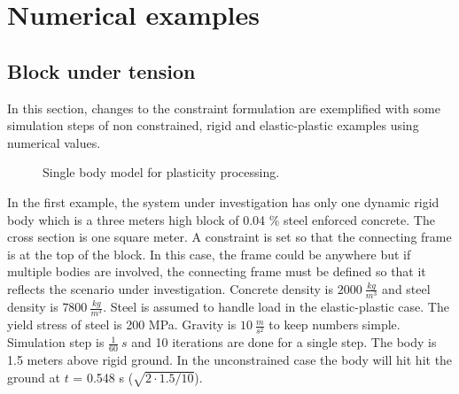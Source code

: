 \section{Numerical examples}

\subsection{Block under tension}
In this section, changes to the constraint formulation are exemplified with some simulation steps
of non constrained, rigid and
elastic-plastic examples using numerical values.

\begin{figure}[htb!]
\centering
{}
\caption{Single body model for plasticity processing.}
\label{fig:tensionModel}
\end{figure}

In the first example, the system under investigation
has only one dynamic rigid body which is a three meters high block of 0.04 \% steel enforced concrete. 
The cross section is one square meter.
A constraint is set so that the connecting frame is at the top of the block. 
In this case, the frame could be anywhere but if multiple bodies are involved, the connecting frame must be defined
so that it reflects the scenario under investigation.
Concrete density is $2000\ \frac{kg}{m^3}$ and steel density is $7800\ \frac{kg}{m^3}$. 
Steel is assumed to handle load in the elastic-plastic case. The yield stress of steel is 200 MPa.
Gravity is $10\ \frac{m}{s^2}$ to keep numbers simple. 
Simulation step is $\frac{1}{60}\ s$ and 10 
iterations are done for a single step.
The body is 1.5 meters above rigid ground. In the unconstrained case the body will hit hit the ground at $t$ = 0.548 s 
($\sqrt{2 \cdot 1.5 / 10}$).

